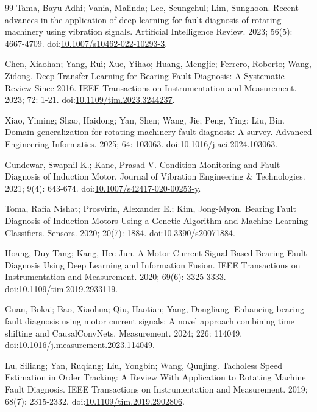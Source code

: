 \documentclass[11pt]{article}
\begin{document}
\begin{thebibliography}{99}
 Tama, Bayu Adhi; Vania, Malinda; Lee, Seungchul; Lim, Sunghoon. Recent advances in the application of deep learning for fault diagnosis of rotating machinery using vibration signals. Artificial Intelligence Review. 2023; 56(5): 4667-4709. doi:\url{10.1007/s10462-022-10293-3}.

 Chen, Xiaohan; Yang, Rui; Xue, Yihao; Huang, Mengjie; Ferrero, Roberto; Wang, Zidong. Deep Transfer Learning for Bearing Fault Diagnosis: A Systematic Review Since 2016. IEEE Transactions on Instrumentation and Measurement. 2023; 72: 1-21. doi:\url{10.1109/tim.2023.3244237}.

 Xiao, Yiming; Shao, Haidong; Yan, Shen; Wang, Jie; Peng, Ying; Liu, Bin. Domain generalization for rotating machinery fault diagnosis: A survey. Advanced Engineering Informatics. 2025; 64: 103063. doi:\url{10.1016/j.aei.2024.103063}.

 Gundewar, Swapnil K.; Kane, Prasad V. Condition Monitoring and Fault Diagnosis of Induction Motor. Journal of Vibration Engineering \& Technologies. 2021; 9(4): 643-674. doi:\url{10.1007/s42417-020-00253-y}.

 Toma, Rafia Nishat; Prosvirin, Alexander E.; Kim, Jong-Myon. Bearing Fault Diagnosis of Induction Motors Using a Genetic Algorithm and Machine Learning Classifiers. Sensors. 2020; 20(7): 1884. doi:\url{10.3390/s20071884}.

 Hoang, Duy Tang; Kang, Hee Jun. A Motor Current Signal-Based Bearing Fault Diagnosis Using Deep Learning and Information Fusion. IEEE Transactions on Instrumentation and Measurement. 2020; 69(6): 3325-3333. doi:\url{10.1109/tim.2019.2933119}.

 Guan, Bokai; Bao, Xiaohua; Qiu, Haotian; Yang, Dongliang. Enhancing bearing fault diagnosis using motor current signals: A novel approach combining time shifting and CausalConvNets. Measurement. 2024; 226: 114049. doi:\url{10.1016/j.measurement.2023.114049}.

 Lu, Siliang; Yan, Ruqiang; Liu, Yongbin; Wang, Qunjing. Tacholess Speed Estimation in Order Tracking: A Review With Application to Rotating Machine Fault Diagnosis. IEEE Transactions on Instrumentation and Measurement. 2019; 68(7): 2315-2332. doi:\url{10.1109/tim.2019.2902806}.


\end{thebibliography}
\end{document}
